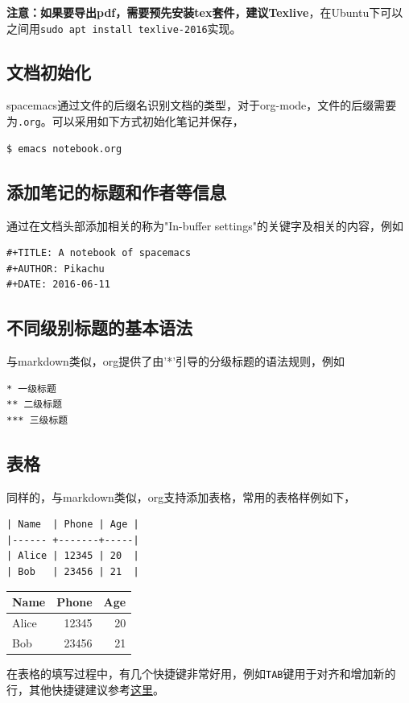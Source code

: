 \documentclass[11pt]{article}
\begin{document}
\textbf{注意：如果要导出pdf，需要预先安装tex套件，建议Texlive}，在Ubuntu下可以之间用\texttt{sudo apt install texlive-2016}实现。

\subsection{文档初始化}
\label{sec:org482bb9e}
spacemacs通过文件的后缀名识别文档的类型，对于org-mode，文件的后缀需要为\texttt{.org}。可以采用如下方式初始化笔记并保存，
\begin{center}
\begin{verbatim}
$ emacs notebook.org
\end{verbatim}
\end{center}

\subsection{添加笔记的标题和作者等信息}
\label{sec:org2810a51}
通过在文档头部添加相关的称为"In-buffer settings"的关键字及相关的内容，例如
\begin{verbatim}
#+TITLE: A notebook of spacemacs
#+AUTHOR: Pikachu
#+DATE: 2016-06-11
\end{verbatim}

\subsection{不同级别标题的基本语法}
\label{sec:org561865b}
与markdown类似，org提供了由'*'引导的分级标题的语法规则，例如
\begin{verbatim}
* 一级标题
** 二级标题
*** 三级标题
\end{verbatim}
\subsection{表格}
\label{sec:org8ba9337}
同样的，与markdown类似，org支持添加表格，常用的表格样例如下，
\begin{center}
\begin{verbatim}
| Name  | Phone | Age |
|------ +-------+-----|
| Alice | 12345 | 20  |
| Bob   | 23456 | 21  |
\end{verbatim}
\end{center}

\begin{center}
\begin{tabular}{lrr}
Name & Phone & Age\\
\hline
Alice & 12345 & 20\\
Bob & 23456 & 21\\
\end{tabular}
\end{center}
在表格的填写过程中，有几个快捷键非常好用，例如\texttt{TAB}键用于对齐和增加新的行，其他快捷键建议参考\href{https://www.cnblogs.com/Open\_Source/archive/2011/07/17/2108747.html\#sec-3}{这里}。
\end{document}
